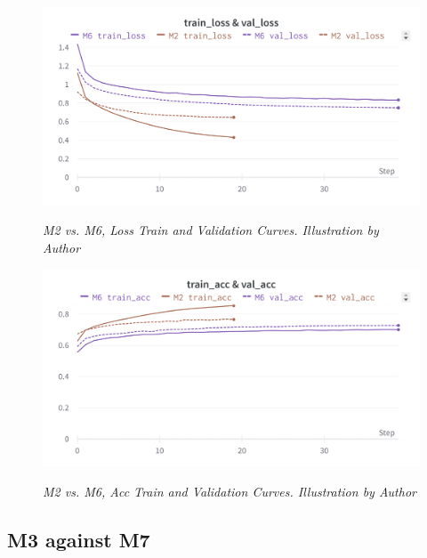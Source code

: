 \begin{figure}[H]
\centering
    \includegraphics[width=\textwidth]{imatges/results/LossM2M6.png}
\caption[M2 vs. M6, Loss Train and Validation Curves]{\textit{M2 vs. M6, Loss Train and Validation Curves. Illustration by Author}}
{\label{fig:lossm0m4}}
\end{figure}


\begin{figure}[H]
\centering
    \includegraphics[width=\textwidth]{imatges/results/AccM2M6.png}
\caption[M2 vs. M6, Acc Train and Validation Curves]{\textit{M2 vs. M6, Acc Train and Validation Curves. Illustration by Author}}
{\label{fig:accm0m4}}
\end{figure}

\newpage

\subsection{M3 against M7}

